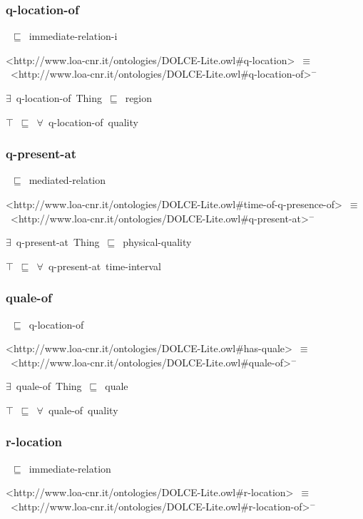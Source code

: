 \documentclass{article}
\begin{document}
\subsubsection*{q-location-of}

~\ensuremath{\sqsubseteq}~immediate-relation-i

<http://www.loa-cnr.it/ontologies/DOLCE-Lite.owl#q-location>~\ensuremath{\equiv}~<http://www.loa-cnr.it/ontologies/DOLCE-Lite.owl#q-location-of>\ensuremath{^-}

\ensuremath{\exists}~q-location-of~Thing~\ensuremath{\sqsubseteq}~region

\ensuremath{\top}~\ensuremath{\sqsubseteq}~\ensuremath{\forall}~q-location-of~quality

\subsubsection*{q-present-at}

~\ensuremath{\sqsubseteq}~mediated-relation

<http://www.loa-cnr.it/ontologies/DOLCE-Lite.owl#time-of-q-presence-of>~\ensuremath{\equiv}~<http://www.loa-cnr.it/ontologies/DOLCE-Lite.owl#q-present-at>\ensuremath{^-}

\ensuremath{\exists}~q-present-at~Thing~\ensuremath{\sqsubseteq}~physical-quality

\ensuremath{\top}~\ensuremath{\sqsubseteq}~\ensuremath{\forall}~q-present-at~time-interval

\subsubsection*{quale-of}

~\ensuremath{\sqsubseteq}~q-location-of

<http://www.loa-cnr.it/ontologies/DOLCE-Lite.owl#has-quale>~\ensuremath{\equiv}~<http://www.loa-cnr.it/ontologies/DOLCE-Lite.owl#quale-of>\ensuremath{^-}

\ensuremath{\exists}~quale-of~Thing~\ensuremath{\sqsubseteq}~quale

\ensuremath{\top}~\ensuremath{\sqsubseteq}~\ensuremath{\forall}~quale-of~quality

\subsubsection*{r-location}

~\ensuremath{\sqsubseteq}~immediate-relation

<http://www.loa-cnr.it/ontologies/DOLCE-Lite.owl#r-location>~\ensuremath{\equiv}~<http://www.loa-cnr.it/ontologies/DOLCE-Lite.owl#r-location-of>\ensuremath{^-}
\end{document}
